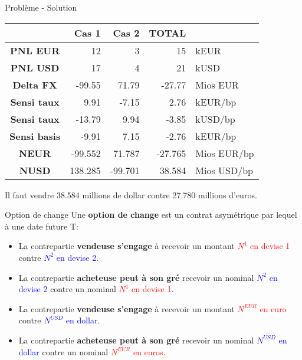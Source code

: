 \documentclass{beamer}
\begin{document}
\begin{frame}{Problème - Solution}
\begin{center}
\begin{tabular}{|c|r|r|r|l|}
\hline
&\textbf{Cas 1}&\textbf{Cas 2}&\textbf{TOTAL}& \\
\hline
\hline
\textbf{PNL EUR} &12&3&15&kEUR\\
\textbf{PNL USD} &17&4&21&kUSD\\
\hline
\hline
\textbf{Delta FX} &-99.55&71.79&-27.77&Mios EUR\\
\textbf{Sensi taux} &9.91&-7.15&2.76&kEUR/bp\\
\textbf{Sensi taux} &-13.79&9.94&-3.85&kUSD/bp\\
\textbf{Sensi basis} &-9.91&7.15&-2.76&kEUR/bp\\
\hline
\hline
\textbf{NEUR} &-99.552&71.787&-27.765&Mios EUR/bp\\
\textbf{NUSD} &138.285&-99.701&38.584&Mios USD/bp\\
\hline
\end{tabular}
\end{center}
Il faut vendre 38.584 millions de dollar contre 27.780 millions d'euros.
\end{frame}

\begin{frame}{Option de change}
Une \textbf{option de change} est un contrat asymétrique par lequel à une date future T:\\
\vspace{0.5cm}
\begin{overprint}
\begin{itemize}
\item La contrepartie \textbf{vendeuse s'engage} à recevoir un montant \textcolor{red}{$N^1$ en devise 1} contre \textcolor{blue}{$N^2$ en devise 2}.
\item La contrepartie \textbf{acheteuse peut à son gré} recevoir un nominal \textcolor{blue}{$N^2$ en devise 2} contre un nominal \textcolor{red}{$N^1$ en devise 1}.
\end{itemize}
\begin{itemize}
\item La contrepartie \textbf{vendeuse s'engage} à recevoir un montant \textcolor{red}{$N^{EUR}$ en euro} contre \textcolor{blue}{$N^{USD}$ en dollar}.
\item La contrepartie \textbf{acheteuse peut à son gré} recevoir un nominal \textcolor{blue}{$N^{USD}$ en dollar} contre un nominal \textcolor{red}{$N^{EUR}$ en euros}.
\end{itemize}
\end{overprint}
\end{frame}
\end{document}
